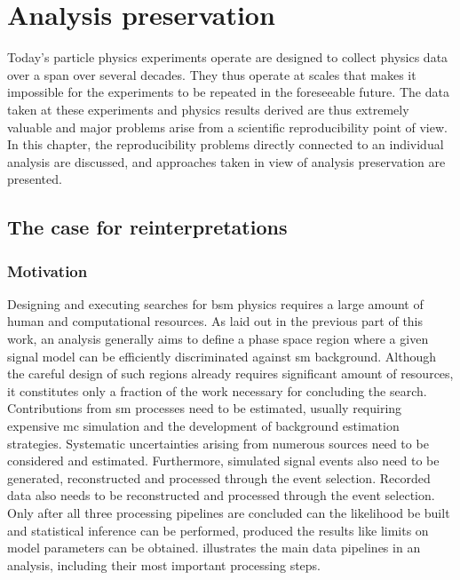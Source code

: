 
\chapter{Analysis preservation}\label{ch:preservation}

\ifpdf
    \graphicspath{{chapter-preservation/Figs/Raster/}{chapter-preservation/Figs/PDF/}{chapter-preservation/Figs/}}
\else
    \graphicspath{{chapter-preservation/Figs/Vector/}{chapter-preservation/Figs/}}
\fi

Today's particle physics experiments operate are designed to collect physics data over a span over several decades. They thus operate at scales that makes it impossible for the experiments to be repeated in the foreseeable future. The data taken at these experiments and physics results derived are thus extremely valuable and major problems arise from a scientific reproducibility point of view. In this chapter, the reproducibility problems directly connected to an individual analysis are discussed, and approaches taken in view of analysis preservation are presented.

\section{The case for reinterpretations}\label{sec:reinterpretations}

\subsection{Motivation}
Designing and executing searches for \gls{bsm} physics requires a large amount of human and computational resources. As laid out in the previous part of this work, an analysis generally aims to define a phase space region where a given signal model can be efficiently discriminated against \gls{sm} background. Although the careful design of such regions already requires significant amount of resources, it constitutes only a fraction of the work necessary for concluding the search. Contributions from \gls{sm} processes need to be estimated, usually requiring expensive \gls{mc} simulation and the development of background estimation strategies. Systematic uncertainties arising from numerous sources need to be considered and estimated. Furthermore, simulated signal events also need to be generated, reconstructed and processed through the event selection. Recorded data also needs to be reconstructed and processed through the event selection. Only after all three processing pipelines are concluded can the likelihood be built and statistical inference can be performed, produced the results like \eg limits on model parameters can be obtained.  illustrates the main data pipelines in an analysis, including their most important processing steps.

